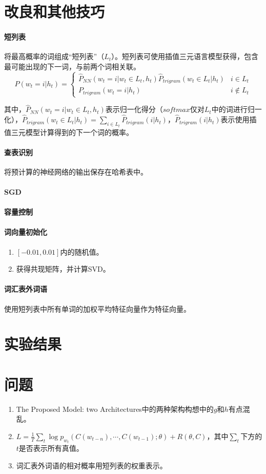 \documentclass[UTF8]{ctexart}
\begin{document}
\section{改良和其他技巧}
\paragraph{短列表}
将最高概率的词组成“短列表”（$L_{t}$）。短列表可使用插值三元语言模型获得，包含最可能出现的下一词，与前两个词相关联。
$$
P(w_{t}=i|h_{t})=
\begin{cases}
\widehat{P}_{NN}(w_{t}=i|w_{t}\in L_{t},h_{t})\widehat{P}_{trigram}(w_{t}\in L_{t}|h_{t}) & {i\in L_{t}}\\
P_{trigram}(w_{t}=i|h_{t}) & {i\notin L_{t}}
\end{cases}
$$
\par{其中，$\widehat{P}_{NN}(w_{t}=i|w_{t}\in L_{t},h_{t})$表示归一化得分（$softmax$仅对$L_{t}$中的词进行归一化），$\widehat{P}_{trigram}(w_{t}\in L_{t}|h_{t})=\sum_{i\in L_{t}}\widehat{P}_{trigram}(i|h_{t})$，$\widehat{P}_{trigram}(i|h_{t})$表示使用插值三元模型计算得到的下一个词的概率。}
\paragraph{查表识别}
将预计算的神经网络的输出保存在哈希表中。
\paragraph{SGD}
\paragraph{容量控制}
\paragraph{词向量初始化}
\begin{enumerate}
  \item $[-0.01,0.01]$内的随机值。
  \item 获得共现矩阵，并计算SVD。
\end{enumerate}
\paragraph{词汇表外词语}
使用短列表中所有单词的加权平均特征向量作为特征向量。
\section{实验结果}

\section{问题}
\begin{enumerate}
  \item The Proposed Model: two Architectures中的两种架构构想中的$g$和$h$有点混乱。
  \item $L=\frac{1}{T}\sum_{t}\log p_{w_{t}}(C(w_{t-n}),\cdots,C(w_{t-1});\theta)+R(\theta,C)$，其中$\sum_{t}$下方的$t$是否表示所有真值。
  \item 词汇表外词语的相对概率用短列表的权重表示。
\end{enumerate}
\end{document}
